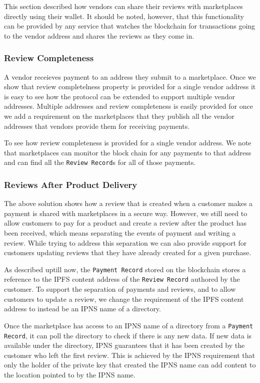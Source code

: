 \documentclass[a4paper]{article}
\begin{document}
This section described how vendors can share their reviews with
marketplaces directly using their wallet. It should be noted, however,
that this functionality can be provided by any service that watches
the blockchain for transactions going to the vendor address and shares
the reviews as they come in.

\subsubsection{Review Completeness}

A vendor receieves payment to an address they submit to a marketplace.
Once we show that review completelness property is provided for a
single vendor address it is easy to see how the protocol can be
extended to support multiple vendor addresses. Multiple addresses and
review completeness is easily provided for once we add a requirement
on the marketplaces that they publish all the vendor addresses that
vendors provide them for receiving payments.

To see how review completeness is provided for a single vendor
address. We note that marketplaces can monitor the block chain for any
payments to that address and can find all the \texttt{Review Record}s
for all of those payments.

\subsubsection{Reviews After Product Delivery}

The above solution shows how a review that is created when a customer
makes a payment is shared with marketplaces in a secure way. However,
we still need to allow customers to pay for a product and create a
review after the product has been received, which means separating the
events of payment and writing a review. While trying to address this
separation we can also provide support for customers updating reviews
that they have already created for a given purchase.

As described uptill now, the \texttt{Payment Record} stored on the
blockchain stores a reference to the IPFS content address of the
\texttt{Review Record} authored by the customer. To support the
separation of payments and reviews, and to allow customers to update a
review, we change the requirement of the IPFS content address to
instead be an IPNS name of a directory.

Once the marketplace has access to an IPNS name of a directory from a
\texttt{Payment Record}, it can poll the directory to check if there
is any new data. If new data is available under the directory, IPNS
guarantees that it has been created by the customer who left the first
review. This is achieved by the IPNS requirement that only the holder
of the private key that created the IPNS name can add content to the
location pointed to by the IPNS name.
\end{document}
